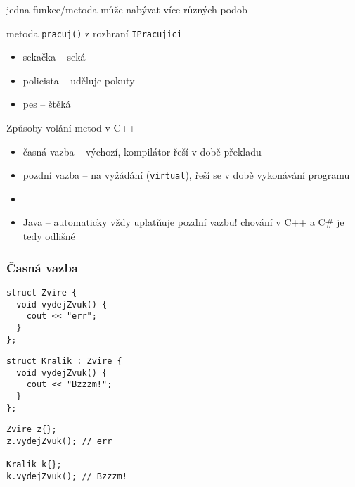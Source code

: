 
\begin{frame}[fragile]
\begin{bitemize}
\item jedna funkce/metoda může nabývat více různých podob
\item metoda \lstinline|pracuj()| z rozhraní \lstinline|IPracujici|
\begin{itemize}
\item sekačka -- seká
\item policista -- uděluje pokuty
\item pes -- štěká
\end{itemize}
\end{bitemize}

\begin{noteblock}{Způsoby volání metod v C++}
\begin{itemize}
\item časná vazba -- výchozí, kompilátor řeší v době překladu
\item pozdní vazba -- na vyžádání (\lstinline|virtual|), řeší se v době vykonávání programu
\item []
\item Java -- automaticky vždy uplatňuje pozdní vazbu! chování v C++ a C\# je tedy odlišné
\end{itemize}
\end{noteblock}
\end{frame}







\begin{frame}[fragile]
\frametitle{Časná vazba}

\begin{yesblock}
\begin{twocols}
\begin{lstlisting}
struct Zvire {
  void vydejZvuk() {
    cout << "err";
  }
};
\end{lstlisting}

\twocolssep

\begin{lstlisting}
struct Kralik : Zvire {
  void vydejZvuk() {
    cout << "Bzzzm!";
  }
};
\end{lstlisting}
\end{twocols}
\end{yesblock}

\begin{yesblock}
\begin{lstlisting}
Zvire z{};
z.vydejZvuk(); // err

Kralik k{};
k.vydejZvuk(); // Bzzzm!
\end{lstlisting}
\end{yesblock}
\end{frame}







